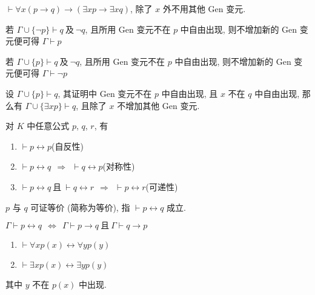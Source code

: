 \documentclass[
    mode=hazy,
    color=blue,
    device=normal,
    lang=cn
]{elegantnote}
\begin{document}
        \begin{proposition}
            $\vdash \forall x(p\to q)\to (\exists xp\to \exists xq)$, 除了 $x$ 外不用其他 Gen 变元.
        \end{proposition}
        \begin{theorem}[反证律]
            若 $\Gamma\cup\{\lnot p\}\vdash q\ \text{及}\ \lnot q$, 且所用 Gen 变元不在 $p$ 中自由出现, 则不增加新的 Gen 变元便可得 $\Gamma \vdash p$
        \end{theorem}
        \begin{theorem}[归谬律]
            若 $\Gamma\cup\{p\}\vdash q\ \text{及}\ \lnot q$, 且所用 Gen 变元不在 $p$ 中自由出现, 则不增加新的 Gen 变元便可得 $\Gamma \vdash\lnot p$
        \end{theorem}
        \begin{proposition}[$\exists_2$ 规则]
            设 $\Gamma\cup\{p\}\vdash q$, 其证明中 Gen 变元不在 $p$ 中自由出现, 且 $x$ 不在 $q$ 中自由出现, 那么有 $\Gamma\cup\{\exists xp\}\vdash q$, 且除了 $x$ 不增加其他 Gen 变元.
        \end{proposition}
        \begin{proposition}
            对 $K$ 中任意公式 $p$, $q$, $r$, 有
            \begin{enumerate}[label = $\arabic*^\circ$]
                \item $\vdash p\leftrightarrow p$\hfill (自反性)
                \item $\vdash p\leftrightarrow q\ \ \Rightarrow\ \ \vdash q\leftrightarrow p$\hfill (对称性)
                \item $\vdash p\leftrightarrow q\ \text{且}\ \vdash q\leftrightarrow r\ \ \Rightarrow\ \ \vdash p\leftrightarrow r$\hfill (可递性)
            \end{enumerate}
        \end{proposition}
        \begin{definition}[可证等价]
            $p$ 与 $q$ 可证等价 (简称为等价), 指 $\vdash p\leftrightarrow q$ 成立.
        \end{definition}
        \begin{proposition}
            $\Gamma\vdash p\leftrightarrow q\ \ \Leftrightarrow\ \ \Gamma\vdash p\to q\ \text{且}\ \Gamma\vdash q\to p$
        \end{proposition}
        \begin{proposition}
            \hfill
            \begin{enumerate}[label = $\arabic*^\circ$]
                \item $\vdash \forall x p(x)\leftrightarrow \forall y p(y)$
                \item $\vdash \exists x p(x)\leftrightarrow \exists y p(y)$
            \end{enumerate}
            其中 $y$ 不在 $p(x)$ 中出现.
        \end{proposition}
\end{document}
